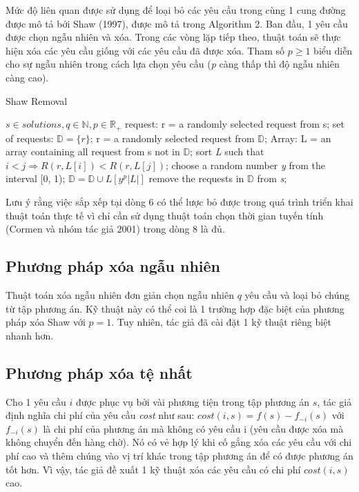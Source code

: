 Mức độ liên quan được sử dụng để loại bỏ các yêu cầu trong cùng 1 cung đường được mô tả bởi Shaw (1997), được mô tả trong Algorithm 2. Ban đầu, 1 yêu cầu được chọn ngẫu nhiên và xóa. Trong các vòng lặp tiếp theo, thuật toán sẽ thực hiện xóa các yêu cầu giống với các yêu cầu đã được xóa. Tham số $p \geqslant 1$ biểu diễn cho sự ngẫu nhiên trong cách lựa chọn yêu cầu (\textit{p} càng thấp thì độ ngẫu nhiên càng cao).

\begin{algorithm}
	\caption{Shaw Removal} 
	\begin{algorithmic}[1]
        \Require $s \in {solutions}, q \in \mathbb{N}, p \in \mathbb{R}_{+}$
        \State request: r = a randomly selected request from s;
        \State set of requests: $\mathbb{D}=\{r\}$;
		  \State r = a randomly selected request from $\mathbb{D}$;
            \State Array: L = an array containing all request from s not in $\mathbb{D}$;
            \State sort \textit{L} such that $i<j \Rightarrow R(r, L\left[ i \right]) < R(r, L\left[ j \right])$;
            \State choose a random number \textit{y} from the interval [0, 1);
            \State $\mathbb{D}=\mathbb{D}\cup {L \left[ y^p|L| \right]}$
        \EndWhile
    \State remove the requests in $\mathbb{D}$ from \textit{s};
	\end{algorithmic} 
\end{algorithm}

Lưu ý rằng việc sắp xếp tại dòng 6 có thể lược bỏ được trong quá trình triển khai thuật toán thực tế vì chỉ cần sử dụng thuật toán chọn thời gian tuyến tính (Cormen và nhóm tác giả 2001) trong dòng 8 là đủ.

\subsection{Phương pháp xóa ngẫu nhiên}
Thuật toán xóa ngẫu nhiên đơn giản chọn ngẫu nhiên $q$ yêu cầu và loại bỏ chúng từ tập phương án. Kỹ thuật này có thể coi là 1 trường hợp đặc biệt của phương pháp xóa Shaw với $p=1$. Tuy nhiên, tác giả đã cài đặt 1 kỹ thuật riêng biệt nhanh hơn.

\subsection{Phương pháp xóa tệ nhất}
Cho 1 yêu cầu $i$ được phục vụ bởi vài phương tiện trong tập phương án $s$, tác giả định nghĩa chi phí của yêu cầu \textit{cost} như sau: $cost(i,s)=f(s)-f_{-i}(s)$ với $f_{-i}(s)$ là chi phí của phương án mà không có yêu cầu i (yêu cầu được xóa mà không chuyển đến hàng chờ). Nó có vẻ hợp lý khi cố gắng xóa các yêu cầu với chi phí cao và thêm chúng vào vị trí khác trong tập phương án để có được phương án tốt hơn. Vì vậy, tác giả đề xuất 1 kỹ thuật xóa các yêu cầu có chi phí $cost(i, s)$ cao.

